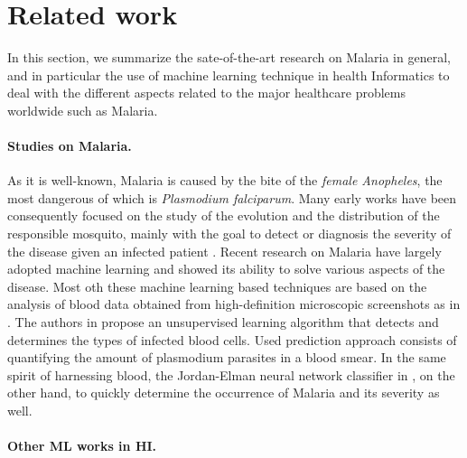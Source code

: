 \section{Related work}\label{related_work}
In this section, we summarize the sate-of-the-art research on Malaria in general, and in particular the
use of machine learning technique in health Informatics to deal with the different aspects related to the 
major healthcare problems worldwide such as Malaria.

\paragraph*{Studies on Malaria.}
As it is well-known, Malaria is caused by the bite of the \emph{female Anopheles}, the most dangerous of which
is \emph{Plasmodium falciparum}. Many early works have been consequently focused on the study of the evolution and
the distribution of the responsible mosquito, mainly with the goal to detect or diagnosis the severity of the 
disease given an infected patient \cite{Fe03,Al09}. Recent research on Malaria have largely adopted machine learning
and showed its ability to solve various aspects of the disease. Most oth these machine learning based techniques are 
based on the analysis of blood data obtained from high-definition microscopic screenshots as in \cite{Ku18}. The authors
in \cite{Ku18} propose an unsupervised learning algorithm that detects and determines the types of infected blood cells.
Used prediction approach consists of quantifying the amount of plasmodium parasites in a blood smear. In the same spirit of 
harnessing blood, the Jordan-Elman neural network classifier in \cite{}, on the other hand, to quickly determine the occurrence 
of Malaria and its severity as well.  

\paragraph*{Other ML works in HI.}
